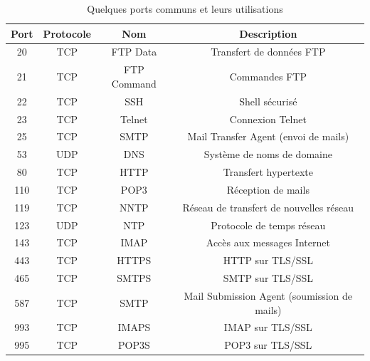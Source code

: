 \documentclass[12pt]{article}
\begin{document}
\begin{table}[h]
    \centering
    \begin{tabular}{|c|c|c|c|}
    \hline
    Port & Protocole & Nom & Description \\
    \hline
    20 & TCP & FTP Data & Transfert de données FTP \\
    \hline
    21 & TCP & FTP Command & Commandes FTP \\
    \hline
    22 & TCP & SSH & Shell sécurisé \\
    \hline
    23 & TCP & Telnet & Connexion Telnet \\
    \hline
    25 & TCP & SMTP & Mail Transfer Agent (envoi de mails) \\
    \hline
    53 & UDP & DNS & Système de noms de domaine \\
    \hline
    80 & TCP & HTTP & Transfert hypertexte \\
    \hline
    110 & TCP & POP3 & Réception de mails \\
    \hline
    119 & TCP & NNTP & Réseau de transfert de nouvelles réseau \\
    \hline
    123 & UDP & NTP & Protocole de temps réseau \\
    \hline
    143 & TCP & IMAP & Accès aux messages Internet \\
    \hline
    443 & TCP & HTTPS & HTTP sur TLS/SSL \\
    \hline
    465 & TCP & SMTPS & SMTP sur TLS/SSL \\
    \hline
    587 & TCP & SMTP & Mail Submission Agent (soumission de mails) \\
    \hline
    993 & TCP & IMAPS & IMAP sur TLS/SSL \\
    \hline
    995 & TCP & POP3S & POP3 sur TLS/SSL \\
    \hline
    \end{tabular}
    \caption{Quelques ports communs et leurs utilisations}
    \label{tab:ports}
\end{table}
\end{document}
